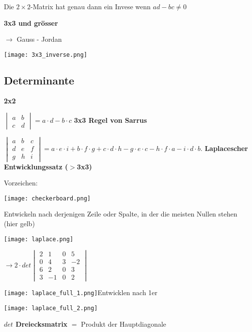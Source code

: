 \begin{multicols*}{3}
{Die $2\times2$-Matrix hat genau dann ein Invese wenn $ad-bc \neq 0$}

\textbf{3x3 und grösser}

{$\rightarrow$ Gauss - Jordan}

 \texttt{[image: 3x3\_inverse.png]} 
\WhiteSpace

\subsection{Determinante}
{\textbf{2x2}}

$\begin{vmatrix}
a & b\\
c & d
\end{vmatrix} = a\cdot d - b\cdot c $
\WhiteSpace
\textbf{3x3 Regel von Sarrus}

$\begin{vmatrix} a & b & c \\ d & e & f \\ g & h &i \end{vmatrix} = a \cdot e \cdot i + b \cdot f \cdot g + c \cdot d \cdot h - g \cdot e \cdot c - h \cdot f \cdot a - i \cdot d \cdot b.$
\WhiteSpace
\textbf{Laplacescher Entwicklungssatz ($ >$3x3)}

{\begin{multicols}{2}
Vorzeichen:

\columnbreak
{ \texttt{[image: checkerboard.png]} }
 
\end{multicols}}

{{Entwickeln nach derjenigen Zeile oder Spalte, in
der die meisten Nullen stehen (hier gelb)}}
{\begin{multicols}{2}
 {\texttt{[image: laplace.png]}}
\columnbreak

{  $ \rightarrow  2 \cdot det \begin{vmatrix} 2 & 1 & 0 & 5 \\ 0 & 4 & 3 & -2 \\ 6 & 2 &0 & 3 \\ 3 & -1 &0 & 2 \end{vmatrix} $}
\end{multicols}}

{\texttt{[image: laplace\_full\_1.png]}Entwicklen nach 1er}  

{\texttt{[image: laplace\_full\_2.png]}}


\textbf{$det$ Dreiecksmatrix}
$ = $ Produkt der Hauptdiagonale
\WhiteSpace


\end{multicols*}
